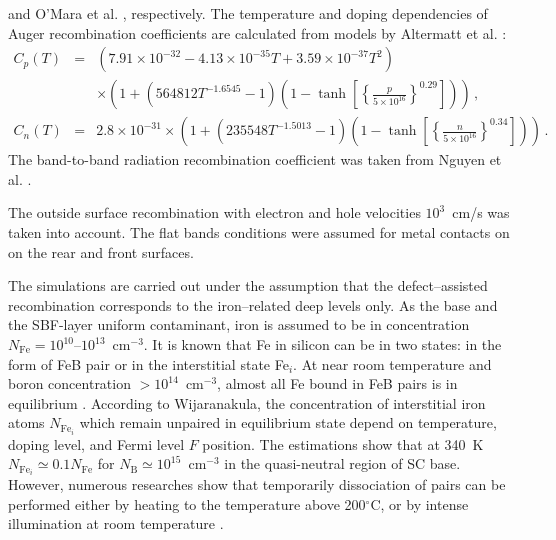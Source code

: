 \documentclass[num-refs]{wiley-article} %
\begin{document}
and O'Mara et al. \cite{OMara}, respectively.
The temperature and doping dependencies of Auger recombination coefficients are calculated from models by Altermatt et al. \cite{Si_Auger}:
\begin{eqnarray}
   \nonumber C_{p} (T)&=& (7.91\times10^{-32}-4.13\times10^{-35}T+3.59\times10^{-37}T^2)\\
  &&\times\left(1+\left(564812T^{-1.6545}-1\right)\left(1-\tanh\left[\left\{\frac{p}{5\times10^{16}}\right\}^{0.29}\right]\right)\right)\,, \\
   C_{n} (T)&=& 2.8\times10^{-31}
  \times\left(1+\left(235548T^{-1.5013}-1\right)\left(1-\tanh\left[\left\{\frac{n}{5\times10^{16}}\right\}^{0.34}\right]\right)\right)\,.
\end{eqnarray}
The band-to-band radiation recombination coefficient was taken from Nguyen et al. \cite{Si_BtB}.

The outside surface recombination with electron and hole velocities $10^3$~cm/s was taken into account.
The flat bands conditions were assumed for metal contacts on on the rear and
front surfaces.

The simulations are carried out under the assumption that the defect–assisted recombination corresponds to the
iron–related deep levels only.
As the base and the SBF-layer uniform contaminant, iron is assumed to be in concentration
$N_{\mathrm{Fe}}=10^{10}$--$10^{13}$~cm$^{-3}$.
It is known that Fe in silicon can be in two states:
in the form of FeB pair or in the interstitial state Fe$_i$.
At near room temperature and boron concentration $>10^{14}$~cm$^{-3}$,
almost all Fe bound in FeB pairs is in equilibrium \cite{FeB:kinetic,FeBAssJAP2014,FeBAssSST2011,FeBJAP2005}.
According to Wijaranakula\cite{FeB:kinetic},
the concentration of interstitial iron atoms $N_{\mathrm{Fe}_i}$ which
remain unpaired in equilibrium state depend on temperature, doping level,
and Fermi level $F$ position.
The estimations show that at 340~K  $N_{\mathrm{Fe}_i}\simeq0.1 N_\mathrm{Fe}$
for $N_\mathrm{B}\simeq10^{15}$~cm$^{-3}$ in the quasi-neutral
region of SC base.
However, numerous researches show that temporarily dissociation of pairs can be performed either by heating to the temperature above 200$^\circ$C,
or by intense illumination at room temperature \cite{FeBAssJAP2014,FeBJAP2005}.
\end{document}
